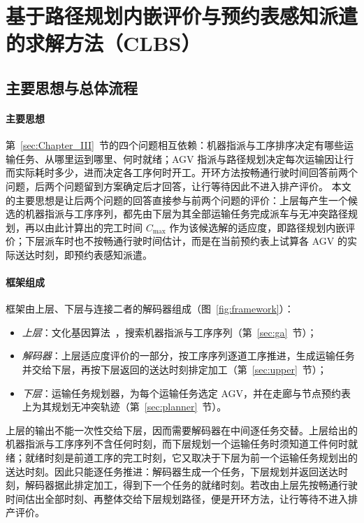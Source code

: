 \documentclass[manuscript,screen,review]{acmart}
\begin{document}
\section{基于路径规划内嵌评价与预约表感知派遣的求解方法（CLBS）}
\label{sec:Chapter_IV}

\subsection{主要思想与总体流程}
\label{sec:overview}

\paragraph{主要思想}
第~\ref{sec:Chapter_III}~节的四个问题相互依赖：机器指派与工序排序决定有哪些运输任务、从哪里运到哪里、何时就绪；AGV 指派与路径规划决定每次运输因让行而实际耗时多少，进而决定各工序何时开工。开环方法按畅通行驶时间回答前两个问题，后两个问题留到方案确定后才回答，让行等待因此不进入排产评价。
本文的主要思想是让后两个问题的回答直接参与前两个问题的评价：上层每产生一个候选的机器指派与工序序列，都先由下层为其全部运输任务完成派车与无冲突路径规划，再以由此计算出的完工时间 $C_{\max}$ 作为该候选解的适应度，即路径规划内嵌评价；下层派车时也不按畅通行驶时间估计，而是在当前预约表上试算各 AGV 的实际送达时刻，即预约表感知派遣。

\paragraph{框架组成}
框架由上层、下层与连接二者的解码器组成（图~\ref{fig:framework}）：
\begin{itemize}[leftmargin=*,topsep=2pt,itemsep=1pt]
  \item \emph{上层}：文化基因算法~\cite{zhang2024memetic}，搜索机器指派与工序序列（第~\ref{sec:ga}~节）；
  \item \emph{解码器}：上层适应度评价的一部分，按工序序列逐道工序推进，生成运输任务并交给下层，再按下层返回的送达时刻排定加工（第~\ref{sec:upper}~节）；
  \item \emph{下层}：运输任务规划器，为每个运输任务选定 AGV，并在走廊与节点预约表上为其规划无冲突轨迹（第~\ref{sec:planner}~节）。
\end{itemize}
上层的输出不能一次性交给下层，因而需要解码器在中间逐任务交替。上层给出的机器指派与工序序列不含任何时刻，而下层规划一个运输任务时须知道工件何时就绪；就绪时刻是前道工序的完工时刻，它又取决于下层为前一个运输任务规划出的送达时刻。因此只能逐任务推进：解码器生成一个任务，下层规划并返回送达时刻，解码器据此排定加工，得到下一个任务的就绪时刻。若改由上层先按畅通行驶时间估出全部时刻、再整体交给下层规划路径，便是开环方法，让行等待不进入排产评价。
\end{document}
